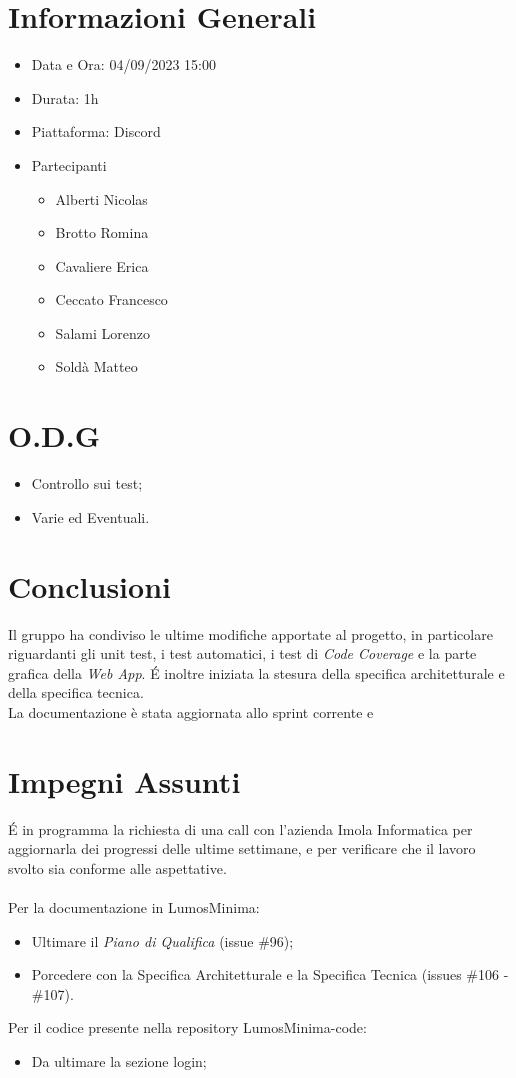 \documentclass[a4paper, 12pt]{article}
\begin{document}
\makefrontpage

\section*{Informazioni Generali}
\begin{itemize}
    \item Data e Ora: 04/09/2023 15:00
    \item Durata: 1h
    \item Piattaforma: Discord
    \item Partecipanti
    \begin{itemize}
        \item Alberti Nicolas
        \item Brotto Romina
        \item Cavaliere Erica
        \item Ceccato Francesco
        \item Salami Lorenzo
        \item Soldà Matteo
    \end{itemize}
\end{itemize}

\section*{O.D.G}
\begin{itemize}
    \item Controllo sui test;
    \item Varie ed Eventuali.
\end{itemize}

\section*{Conclusioni}
Il gruppo ha condiviso le ultime modifiche apportate al progetto, in particolare riguardanti gli unit test, i test automatici, i test di \textit{Code Coverage} e la parte grafica della \textit{Web App}.
\'E inoltre iniziata la stesura della specifica architetturale e della specifica tecnica.\\
La documentazione è stata aggiornata allo sprint corrente e 


\section*{Impegni Assunti}

\'E in programma la richiesta di una call con l'azienda Imola Informatica per aggiornarla dei progressi delle ultime settimane, e per verificare che il lavoro svolto sia conforme alle aspettative.\\ \\
Per la documentazione in LumosMinima:
\begin{itemize}
    \item Ultimare il \textit{Piano di Qualifica} (issue \#96);
    \item Porcedere con la Specifica Architetturale e la Specifica Tecnica (issues \#106 - \#107).
\end{itemize}

Per il codice presente nella repository LumosMinima-code:
\begin{itemize}
    \item Da ultimare la sezione login;
\end{itemize}
\end{document}
